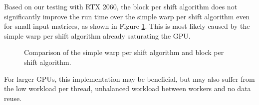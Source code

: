 Based on our testing with RTX 2060, the block per shift algorithm does not significantly improve the run time over the simple warp per shift algorithm even for small input matrices, as shown in Figure \ref{fig:block_per_shift_local_results}. This is most likely caused by the simple warp per shift algorithm already saturating the GPU. 

\begin{figure}[ht]
	\centering
	\def\svgwidth{0.4\textwidth}
	
	\caption{Comparison of the simple warp per shift algorithm and block per shift algorithm.}
	\label{fig:block_per_shift_local_results}
\end{figure}

For larger GPUs, this implementation may be beneficial, but may also suffer from the low workload per thread, unbalanced workload between workers and no data reuse.




